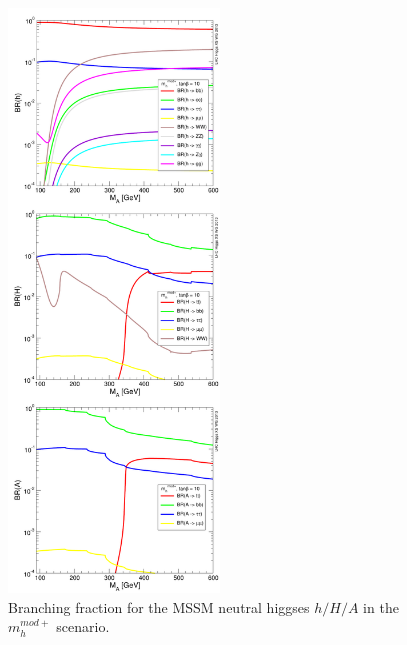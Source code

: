 
\begin{figure}[tp]
     \begin{center}

            \includegraphics[width=0.5\textwidth]{figure/br.png}

    \end{center}
    \caption{Branching fraction for the MSSM neutral higgses $h/H/A$ in the $m_h^{mod+}$ scenario.}
   \label{fig:br}

\end{figure}


